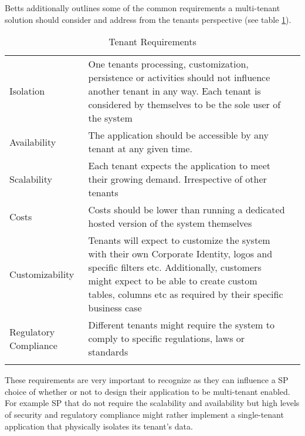 Betts \cite{Betts2012-ad} additionally outlines some of the common requirements a multi-tenant solution should consider and address from the tenants perspective (see table \ref{table:tenant-requirements}).

\begin{table}[H]
\centering
\begin{tabularx}{\textwidth}{l X l}
\cline{1-2}
\multicolumn{1}{|l|}{\cellcolor[HTML]{EFEFEF}Isolation} & \multicolumn{1}{X|}{One tenants processing, customization, persistence or activities should not influence another tenant in any way. Each tenant is considered by themselves to be the sole user of the system} &  \\ \cline{1-2}
\multicolumn{1}{|l|}{\cellcolor[HTML]{EFEFEF}Availability} & \multicolumn{1}{X|}{The application should be accessible by any tenant at any given time.} &  \\ \cline{1-2}
\multicolumn{1}{|l|}{\cellcolor[HTML]{EFEFEF}Scalability} & \multicolumn{1}{X|}{Each tenant expects the application to meet their growing demand. Irrespective of other tenants} &  \\ \cline{1-2}
\multicolumn{1}{|l|}{\cellcolor[HTML]{EFEFEF}Costs} & \multicolumn{1}{X|}{Costs should be lower than running a dedicated hosted version of the system themselves} &  \\ \cline{1-2}
\multicolumn{1}{|l|}{\cellcolor[HTML]{EFEFEF}Customizability} & \multicolumn{1}{X|}{Tenants will expect to customize the system with their own Corporate Identity, logos and specific filters etc. Additionally, customers might expect to be able to create custom tables, columns etc as required by their specific business case} &  \\ \cline{1-2}
\multicolumn{1}{|l|}{\cellcolor[HTML]{EFEFEF}Regulatory Compliance} & \multicolumn{1}{X|}{Different tenants might require the system to comply to specific regulations, laws or standards} &  \\ \cline{1-2}
 &  & 
\end{tabularx}
\caption{Tenant Requirements}
\label{table:tenant-requirements}
\end{table}

These requirements are very important to recognize as they can influence a SP choice of whether or not to design their application to be multi-tenant enabled. For example SP that do not require the scalability and availability but high levels of security and regulatory compliance might rather implement a single-tenant application that physically isolates its tenant's data.


